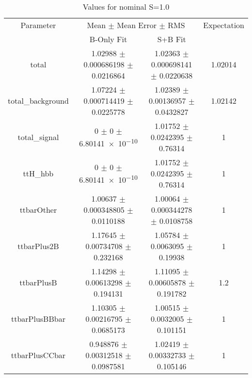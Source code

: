 \begin{table}
\centering
\caption{Values for nominal S=1.0}
\begin{tabular}{cccc}
\toprule
Parameter & \multicolumn{2}{c}{Mean $\pm$ Mean Error $\pm$ RMS} & Expectation\\
 & B-Only Fit & S+B Fit & \\
\midrule
total & \num{1.02988} $\pm$ \num{0.000686198} $\pm$ \num{0.0216864} & \num{1.02363} $\pm$ \num{0.000698141} $\pm$ \num{0.0220638} & \num{1.02014}\\
total\_background & \num{1.07224} $\pm$ \num{0.000714419} $\pm$ \num{0.0225778} & \num{1.02389} $\pm$ \num{0.00136957} $\pm$ \num{0.0432827} & \num{1.02142}\\
total\_signal & \num{0} $\pm$ \num{0} $\pm$ \num{6.80141e-10} & \num{1.01752} $\pm$ \num{0.0242395} $\pm$ \num{0.76314} & \num{1}\\
ttH\_hbb & \num{0} $\pm$ \num{0} $\pm$ \num{6.80141e-10} & \num{1.01752} $\pm$ \num{0.0242395} $\pm$ \num{0.76314} & \num{1}\\
ttbarOther & \num{1.00637} $\pm$ \num{0.000348805} $\pm$ \num{0.0110188} & \num{1.00064} $\pm$ \num{0.000344278} $\pm$ \num{0.0108758} & \num{1}\\
ttbarPlus2B & \num{1.17645} $\pm$ \num{0.00734708} $\pm$ \num{0.232168} & \num{1.05784} $\pm$ \num{0.0063095} $\pm$ \num{0.19938} & \num{1}\\
ttbarPlusB & \num{1.14298} $\pm$ \num{0.00613298} $\pm$ \num{0.194131} & \num{1.11095} $\pm$ \num{0.00605878} $\pm$ \num{0.191782} & \num{1.2}\\
ttbarPlusBBbar & \num{1.10305} $\pm$ \num{0.00216795} $\pm$ \num{0.0685173} & \num{1.00515} $\pm$ \num{0.0032005} $\pm$ \num{0.101151} & \num{1}\\
ttbarPlusCCbar & \num{0.948876} $\pm$ \num{0.00312518} $\pm$ \num{0.0987581} & \num{1.02419} $\pm$ \num{0.00332733} $\pm$ \num{0.105146} & \num{1}\\
\bottomrule
\end{tabular}
\end{table}